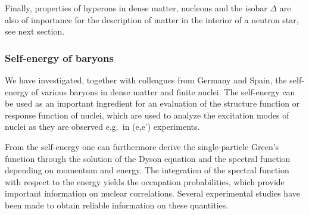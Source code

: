 Finally,
properties of hyperons    in     dense matter, nucleons
and the isobar $\Delta$ are also of importance for the description
of matter in the interior of a neutron star, see next section. 

\subsubsection{Self-energy of baryons}


We have investigated, together with colleagues from
Germany and Spain,  the self-energy of various baryons
in dense matter and finite nuclei.
The self-energy can be
used as an important ingredient for an evaluation of the structure
function or response function of nuclei, which are used to
analyze the excitation modes of nuclei as they are observed
e.g.\ in (e,e') experiments.

From the self-energy one can furthermore derive the single-particle
Green's function through the solution of the Dyson equation and
the spectral function depending on momentum
and energy. The integration of the spectral function with respect
to the energy yields the occupation
probabilities, which provide important information on nuclear
correlations. Several experimental studies have been made
to obtain reliable information on these quantities.



